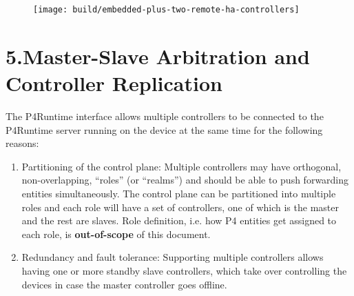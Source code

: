 \documentclass[11pt]{article}
\begin{document}
{%
\begin{figure}[tbp]%
\begin{mdcenter}%

\noindent{}\texttt{[image: build/embedded-plus-two-remote-ha-controllers]}{}%

\mdhr{}%

\noindent{}%
\end{mdcenter}\label{fig-embedded-plus-two-remote-ha-controllers}%
\end{figure}%

\section{5.\hspace*{0.5em}Master-Slave Arbitration and Controller Replication}\label{sec-master-slave-arbitration-and-controller-replication}%

\noindent{}The P4Runtime interface allows multiple controllers to be connected to the
P4Runtime server running on the device at the same time for the following
reasons:%

\begin{enumerate}%

\item{}
Partitioning of the control plane: Multiple controllers may have orthogonal,
non-overlapping, \textquotedblleft{}roles\textquotedblright{} (or \textquotedblleft{}realms\textquotedblright{}) and should be able to push forwarding
entities simultaneously. The control plane can be partitioned into multiple
roles and each role will have a set of controllers, one of which is the
master and the rest are slaves. Role definition, i.e. how P4 entities get
assigned to each role, is \textbf{out-of-scope} of this document.%

\item{}
Redundancy and fault tolerance: Supporting multiple controllers allows having
one or more standby slave controllers, which take over controlling the
devices in case the master controller goes offline.%
\end{enumerate}%

}
\end{document}
